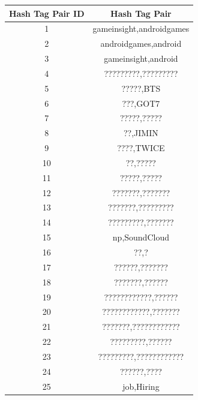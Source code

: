 \documentclass[11pt,a4paper,oneside]{article}
\begin{document}
     \begin{center}
	    \begin{tabular}{|c|c|}
	    	\hline 
	    	\textbf{Hash Tag Pair ID} & \textbf{Hash Tag Pair} \\
	    	\hline
	    	1 & gameinsight,androidgames \\ 
	    	\hline
	    	2 & androidgames,android \\ 
	    	\hline
	    	3 & gameinsight,android \\ 
	    	\hline
	    	4 & ?????????,????????? \\ 
	    	\hline
	    	5 & ?????,BTS \\ 
	    	\hline
	    	6 & ???,GOT7 \\ 
	    	\hline
	    	7 & ?????,????? \\ 
	    	\hline
	    	8 & ??,JIMIN \\ 
	    	\hline
	    	9 & ????,TWICE \\ 
	    	\hline
	    	10 & ??,????? \\ 
	    	\hline
	    	11 & ?????,????? \\ 
	    	\hline
	    	12 & ???????,??????? \\ 
	    	\hline
	    	13 & ???????,????????? \\ 
	    	\hline
	    	14 & ?????????,??????? \\ 
	    	\hline
	    	15 & np,SoundCloud \\ 
	    	\hline
	    	16 & ??,? \\ 
	    	\hline
	    	17 & ??????,??????? \\ 
	    	\hline
	    	18 & ???????,?????? \\ 
	    	\hline
	    	19 & ????????????,?????? \\ 
	    	\hline
	    	20 & ????????????,??????? \\ 
	    	\hline
	    	21 & ???????,???????????? \\ 
	    	\hline
	    	22 & ?????????,?????? \\ 
	    	\hline
	    	23 & ?????????,???????????? \\ 
	    	\hline
	    	24 & ??????,???? \\ 
	    	\hline
	    	25 & job,Hiring \\ 
	    	\hline
	    	

\end{tabular}
\end{center}
\end{document}
